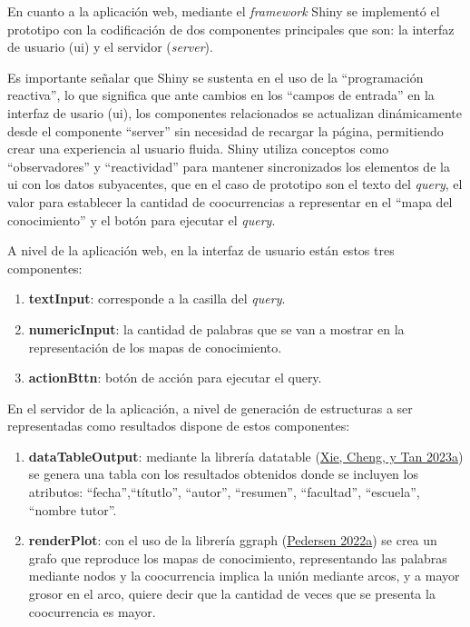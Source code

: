 \documentclass[
  12pt,
  openany]{book}
\begin{document}
En cuanto a la aplicación web, mediante el \emph{framework} Shiny se implementó el prototipo con la codificación de dos componentes principales que son: la interfaz de usuario (ui) y el servidor (\emph{server}).

Es importante señalar que Shiny se sustenta en el uso de la ``programación reactiva'', lo que significa que ante cambios en los ``campos de entrada'' en la interfaz de usario (ui), los componentes relacionados se actualizan dinámicamente desde el componente ``server'' sin necesidad de recargar la página, permitiendo crear una experiencia al usuario fluida. Shiny utiliza conceptos como ``observadores'' y ``reactividad'' para mantener sincronizados los elementos de la ui con los datos subyacentes, que en el caso de prototipo son el texto del \emph{query}, el valor para establecer la cantidad de coocurrencias a representar en el ``mapa del conocimiento'' y el botón para ejecutar el \emph{query}.

\hfill\break
A nivel de la aplicación web, en la interfaz de usuario están estos tres componentes:

\begin{enumerate}
\def\labelenumi{\arabic{enumi}.}
\item
  \textbf{textInput}: corresponde a la casilla del \emph{query}.
\item
  \textbf{numericInput}: la cantidad de palabras que se van a mostrar en la representación de los mapas de conocimiento.
\item
  \textbf{actionBttn}: botón de acción para ejecutar el query.
\end{enumerate}

En el servidor de la aplicación, a nivel de generación de estructuras a ser representadas como resultados dispone de estos componentes:

\begin{enumerate}
\def\labelenumi{\arabic{enumi}.}
\item
  \textbf{dataTableOutput}: mediante la librería datatable (\protect\hyperlink{ref-DT}{Xie, Cheng, y Tan 2023a}) se genera una tabla con los resultados obtenidos donde se incluyen los atributos: ``fecha'',``títutlo'', ``autor'', ``resumen'', ``facultad'', ``escuela'', ``nombre tutor''.
\item
  \textbf{renderPlot}: con el uso de la librería ggraph (\protect\hyperlink{ref-ggraph}{Pedersen 2022a}) se crea un grafo que reproduce los mapas de conocimiento, representando las palabras mediante nodos y la coocurrencia implica la unión mediante arcos, y a mayor grosor en el arco, quiere decir que la cantidad de veces que se presenta la coocurrencia es mayor.
\end{enumerate}
\end{document}
